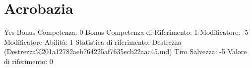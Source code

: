 \section{Acrobazia}\label{acrobazia}

\begin{description}
\tightlist
\item[Tags: ABI]
Yes Bonus Competenza: 0 Bonus Competenza di Riferimento: 1 Modificatore:
-5 Modificatore Abilità: 1 Statistica di riferimento: Destrezza
(Destrezza\%201a12782aeb764225af7635ecb22aac45.md) Tiro Salvezza: -5
Valore di riferimento: 0
\end{description}
